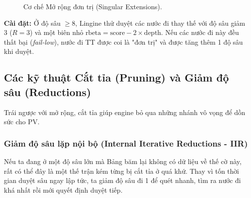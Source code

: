 \begin{figure}[H]
    \caption{Cơ chế Mở rộng đơn trị (Singular Extensions).}
    \label{fig:singular_extensions}
\end{figure}

\textbf{Cài đặt:} Ở độ sâu $\ge 8$, Lingine thử duyệt các nước đi thay thế với độ sâu giảm 3 ($R=3$) và một biên nhỏ $\text{rbeta} = \text{score} - 2 \times \text{depth}$. Nếu các nước đi này đều thất bại (\textit{fail-low}), nước đi TT được coi là "đơn trị" và được tăng thêm 1 độ sâu khi duyệt.

\subsection{Các kỹ thuật Cắt tỉa (Pruning) và Giảm độ sâu (Reductions)}

Trái ngược với mở rộng, cắt tỉa giúp engine bỏ qua những nhánh vô vọng để dồn sức cho PV.

\subsubsection{Giảm độ sâu lặp nội bộ (Internal Iterative Reductions - IIR)}
Nếu ta đang ở một độ sâu lớn mà Bảng băm lại không có dữ liệu về thế cờ này, rất có thể đây là một thế trận kém từng bị cắt tỉa ở quá khứ. Thay vì tốn thời gian duyệt sâu ngay lập tức, ta giảm độ sâu đi 1 để quét nhanh, tìm ra nước đi khá nhất rồi mới quyết định duyệt tiếp.


